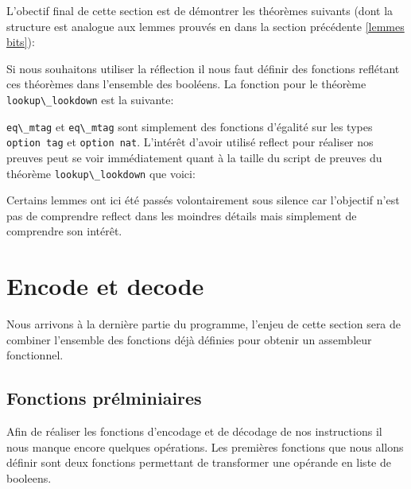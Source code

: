 \documentclass {article}
\newcommand{\codefrom}[3]
           {}
\theoremstyle{definition}
\theoremstyle{remark}
\newcommand{\fun}[1]{\lstinline!#1!}
\begin{document}
L'obectif final de cette section est de démontrer les théorèmes suivants (dont la structure est analogue aux lemmes prouvés
en dans la section précédente \ref{lemmes bits}):

\codefrom{src}{association_list}{lookup_lookdown}
\codefrom{src}{association_list}{lookdown_lookup}


Si nous souhaitons utiliser la réflection il nous faut définir des fonctions reflétant
ces théorèmes dans l'ensemble des booléens. La fonction pour le théorème \fun{lookup\_lookdown}
est la suivante:

\codefrom{src}{association_list}{lookup_encdec}
\fun{eq\_mtag} et \fun{eq\_mtag} sont simplement des fonctions d'égalité sur les types \fun{option tag} et \fun{option nat}.
L'intérêt d'avoir utilisé reflect pour réaliser nos preuves peut se voir immédiatement quant à la taille
du script de preuves du théorème \fun{lookup\_lookdown} que voici:

\codefrom{src}{association_list}{lookup_lookdown}

\codefrom{src}{association_list}{lookup_lookdown_script}

Certains lemmes ont ici été passés volontairement sous silence car l'objectif n'est pas
de comprendre reflect dans les moindres détails mais simplement de comprendre son intérêt.



\section{Encode et decode}
\label{Encode Decode}

Nous arrivons à la dernière partie du programme, l'enjeu de cette section sera de combiner l'ensemble des fonctions
déjà définies pour obtenir un assembleur fonctionnel.

\subsection{Fonctions prélminiaires}

Afin de réaliser les fonctions d'encodage et de décodage de nos instructions il nous manque encore quelques opérations.
Les premières fonctions que nous allons définir sont deux fonctions permettant de transformer une opérande en liste de booleens.

\codefrom{src}{encode}{operand_to_bin}
\end{document}
